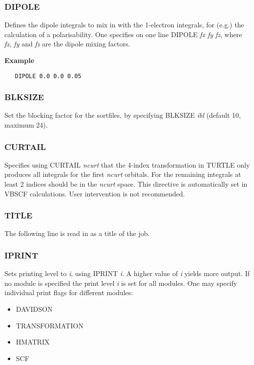 \documentclass[11pt,fleqn]{article}
\begin{document}
\subsubsection{DIPOLE}

Defines the dipole integrals to mix in with the 1-electron integrals,
for (e.g.) the calculation of a polarisability. One specifies on
one line DIPOLE \emph{fx fy fz}, where \emph{fx}, \emph{fy} and \emph{fz} are the dipole mixing factors.

{\bf Example}
\begin{verbatim}
   DIPOLE 0.0 0.0 0.05
\end{verbatim}

\subsubsection{BLKSIZE}

Set the blocking factor for the sortfiles, by
specifying BLKSIZE \emph{ibl} (default 10, maximum 24).

\subsubsection{CURTAIL}

Specifies using CURTAIL \emph{ncurt} that the 4-index transformation in TURTLE 
only produces all integrals for the first \emph{ncurt} orbitals. For the remaining
integrals at least 2 indices should be in the \emph{ncurt} space. 
This directive is automatically set in VBSCF calculations. User intervention
is not recommended.

\subsubsection{TITLE}

The following line is read in as a title of the job. 

\subsubsection{IPRINT}

Sets printing level to \emph{i}, using IPRINT  \emph{i}. A higher value of \emph{i} yields more output. If no module is specified the print level \emph{i} is set for all modules. One may specify individual print flags for different modules:

\begin{itemize}
\item DAVIDSON
\item TRANSFORMATION
\item HMATRIX
\item SCF
\end{itemize}
\end{document}
